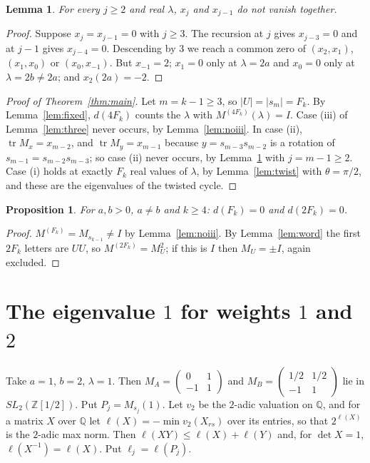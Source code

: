 \documentclass[11pt]{amsart}
\newtheorem{proposition}[theorem]{Proposition}
\newtheorem{lemma}[theorem]{Lemma}
\theoremstyle{definition}
\newcommand{\tr}{\operatorname{tr}}
\newcommand{\Q}{\mathbb{Q}}
\newcommand{\Z}{\mathbb{Z}}
\begin{document}
\begin{lemma}\label{lem:noii}
For every $j\ge2$ and real $\lambda$, $x_j$ and $x_{j-1}$ do not vanish together.
\end{lemma}

\begin{proof}
Suppose $x_j=x_{j-1}=0$ with $j\ge3$. The recursion at $j$ gives $x_{j-3}=0$ and at $j-1$ gives $x_{j-4}=0$.
Descending by $3$ we reach a common zero of $(x_2,x_1)$, $(x_1,x_0)$ or $(x_0,x_{-1})$. But $x_{-1}=2$;
$x_1=0$ only at $\lambda=2a$ and $x_0=0$ only at $\lambda=2b\ne2a$; and $x_2(2a)=-2$.
\end{proof}

\begin{proof}[Proof of Theorem~\ref{thm:main}]
Let $m=k-1\ge3$, so $|U|=|s_m|=F_k$. By Lemma~\ref{lem:fixed}, $d(4F_k)$ counts the $\lambda$ with
$M^{(4F_k)}(\lambda)=I$. Case (iii) of Lemma~\ref{lem:three} never occurs, by Lemma~\ref{lem:noiii}. In case
(ii), $\tr M_x=x_{m-2}$, and $\tr M_y=x_{m-1}$ because $y=s_{m-3}s_{m-2}$ is a rotation of
$s_{m-1}=s_{m-2}s_{m-3}$; so case (ii) never occurs, by Lemma~\ref{lem:noii} with $j=m-1\ge2$. Case (i) holds
at exactly $F_k$ real values of $\lambda$, by Lemma~\ref{lem:twist} with $\theta=\pi/2$, and these are the
eigenvalues of the twisted cycle.
\end{proof}

\begin{proposition}\label{prop:easy}
For $a,b>0$, $a\ne b$ and $k\ge4$: $d(F_k)=0$ and $d(2F_k)=0$.
\end{proposition}

\begin{proof}
$M^{(F_k)}=M_{s_{k-1}}\ne I$ by Lemma~\ref{lem:noiii}. By Lemma~\ref{lem:word} the first $2F_k$ letters are
$UU$, so $M^{(2F_k)}=M_U^2$; if this is $I$ then $M_U=\pm I$, again excluded.
\end{proof}

\section{The eigenvalue $1$ for weights $1$ and $2$}

Take $a=1$, $b=2$, $\lambda=1$. Then $M_A=\left(\begin{smallmatrix}0&1\\-1&1\end{smallmatrix}\right)$ and
$M_B=\left(\begin{smallmatrix}1/2&1/2\\-1&1\end{smallmatrix}\right)$ lie in $SL_2(\Z[1/2])$. Put
$P_j=M_{s_j}(1)$. Let $v_2$ be the $2$-adic valuation on $\Q$, and for a matrix $X$ over $\Q$ let
$\ell(X)=-\min v_2(X_{rs})$ over its entries, so that $2^{\ell(X)}$ is the $2$-adic max norm. Then
$\ell(XY)\le\ell(X)+\ell(Y)$ and, for $\det X=1$, $\ell(X^{-1})=\ell(X)$. Put $\ell_j=\ell(P_j)$.
\end{document}
